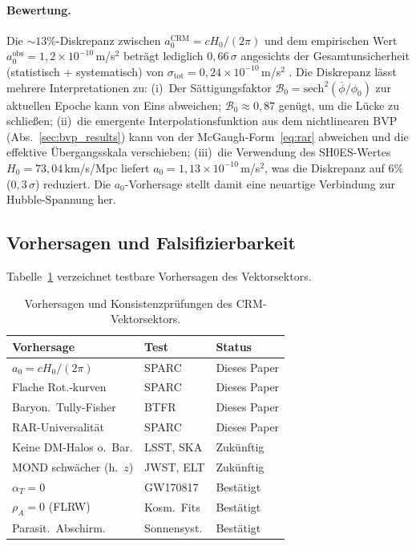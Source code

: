 \documentclass[aps,prd,twocolumn,superscriptaddress,nofootinbib]{revtex4-2}
\begin{document}
\paragraph{Bewertung.}
Die $\sim 13\%$-Diskrepanz zwischen $a_0^{\mathrm{CRM}} = cH_0/(2\pi)$ und dem empirischen Wert $a_0^{\mathrm{obs}} = 1{,}2 \times 10^{-10}$\,m/s$^2$ betr\"agt lediglich $0{,}66\,\sigma$ angesichts der Gesamtunsicherheit (statistisch + systematisch) von $\sigma_{\mathrm{tot}} = 0{,}24 \times 10^{-10}$\,m/s$^2$ \cite{McGaugh2016}. Die Diskrepanz l\"asst mehrere Interpretationen zu: (i)~Der S\"attigungsfaktor $\mathcal{B}_0 = \mathrm{sech}^2(\bar{\phi}/\phi_0)$ zur aktuellen Epoche kann von Eins abweichen; $\mathcal{B}_0 \approx 0{,}87$ gen\"ugt, um die L\"ucke zu schlie\ss{}en; (ii)~die emergente Interpolationsfunktion aus dem nichtlinearen BVP (Abs.~\ref{sec:bvp_results}) kann von der McGaugh-Form~\eqref{eq:rar} abweichen und die effektive \"Ubergangsskala verschieben; (iii)~die Verwendung des SH0ES-Wertes $H_0 = 73{,}04$\,km/s/Mpc \cite{Riess2022} liefert $a_0 = 1{,}13 \times 10^{-10}$\,m/s$^2$, was die Diskrepanz auf $6\%$ ($0{,}3\,\sigma$) reduziert. Die $a_0$-Vorhersage stellt damit eine neuartige Verbindung zur Hubble-Spannung her.

\subsection{Vorhersagen und Falsifizierbarkeit}

Tabelle~\ref{tab:predictions} verzeichnet testbare Vorhersagen des Vektorsektors.

\begin{table}[tbp]
\caption{\label{tab:predictions}Vorhersagen und Konsistenzpr\"ufungen des CRM-Vektorsektors.}
\begin{ruledtabular}
\small
\begin{tabular}{lll}
Vorhersage & Test & Status \\
\hline
$a_0 = cH_0/(2\pi)$ & SPARC & Dieses Paper \\
Flache Rot.-kurven & SPARC & Dieses Paper \\
Baryon.\ Tully-Fisher & BTFR & Dieses Paper \\
RAR-Universalit\"at & SPARC & Dieses Paper \\
Keine DM-Halos o.\ Bar. & LSST, SKA & Zuk\"unftig \\
MOND schw\"acher (h.\ $z$) & JWST, ELT & Zuk\"unftig \\
$\alpha_T = 0$ & GW170817 & Best\"atigt \\
$\rho_A = 0$ (FLRW) & Kosm.\ Fits & Best\"atigt \\
Parasit.\ Abschirm. & Sonnensyst. & Best\"atigt \\
\end{tabular}
\end{ruledtabular}
\end{table}
\end{document}
